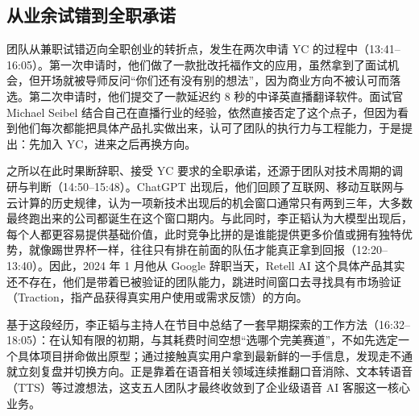 \documentclass[UTF8,a4paper,11pt,fontset=fandol]{ctexart}
\begin{document}
\subsection{从业余试错到全职承诺}
团队从兼职试错迈向全职创业的转折点，发生在两次申请 YC 的过程中（13:41–16:05）。第一次申请时，他们做了一款批改托福作文的应用，虽然拿到了面试机会，但开场就被导师反问“你们还有没有别的想法”，因为商业方向不被认可而落选。第二次申请时，他们提交了一款延迟约 8 秒的中译英直播翻译软件。面试官 Michael Seibel 结合自己在直播行业的经验，依然直接否定了这个点子，但因为看到他们每次都能把具体产品扎实做出来，认可了团队的执行力与工程能力，于是提出：先加入 YC，进来之后再换方向。

之所以在此时果断辞职、接受 YC 要求的全职承诺，还源于团队对技术周期的调研与判断（14:50–15:48）。ChatGPT 出现后，他们回顾了互联网、移动互联网与云计算的历史规律，认为一项新技术出现后的机会窗口通常只有两到三年，大多数最终跑出来的公司都诞生在这个窗口期内。与此同时，李正韬认为大模型出现后，每个人都更容易提供基础价值，此时竞争比拼的是谁能提供更多价值或拥有独特优势，就像踢世界杯一样，往往只有排在前面的队伍才能真正拿到回报（12:20–13:40）。因此，2024 年 1 月他从 Google 辞职当天，Retell AI 这个具体产品其实还不存在，他们是带着已被验证的团队能力，跳进时间窗口去寻找具有市场验证（Traction，指产品获得真实用户使用或需求反馈）的方向。

基于这段经历，李正韬与主持人在节目中总结了一套早期探索的工作方法（16:32–18:05）：在认知有限的初期，与其耗费时间空想“选哪个完美赛道”，不如先选定一个具体项目拼命做出原型；通过接触真实用户拿到最新鲜的一手信息，发现走不通就立刻复盘并切换方向。正是靠着在语音相关领域连续推翻口音消除、文本转语音（TTS）等过渡想法，这支五人团队才最终收敛到了企业级语音 AI 客服这一核心业务。
\end{document}
